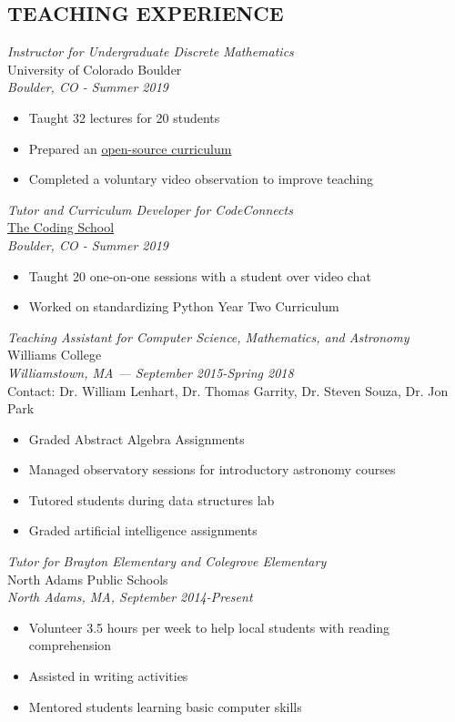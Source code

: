 \documentclass[line,margin]{res}
\begin{document}
\begin{resume}
  \section{TEACHING EXPERIENCE}
  {\sl Instructor for Undergraduate Discrete Mathematics} \\
  University of Colorado Boulder \\
  {\it Boulder, CO - Summer 2019} \\
  \begin{itemize}
      \item Taught 32 lectures for 20 students
      \item Prepared an \href{https://github.com/jmbhughes/CSCI2824-Discrete-Structures}{open-source curriculum}
      \item Completed a voluntary video observation to improve teaching
  \end{itemize}
  
  {\sl Tutor and Curriculum Developer for CodeConnects} \\
  \href{http://www.the-cs.org/}{The Coding School} \\
  {\it Boulder, CO - Summer 2019} \\
  \begin{itemize}
      \item Taught 20 one-on-one sessions with a student over video chat
      \item Worked on standardizing Python Year Two Curriculum
  \end{itemize}
  
  {\sl Teaching Assistant for Computer Science, Mathematics, and Astronomy} \\
  Williams College \\
  {\it Williamstown, MA — September 2015-Spring 2018} \\ 
  Contact: Dr. William Lenhart, Dr. Thomas Garrity, Dr. Steven Souza, Dr. Jon Park \\
  \begin{itemize}
  \item Graded Abstract Algebra Assignments
  \item Managed observatory sessions for introductory astronomy courses
  \item Tutored students during data structures lab
  \item Graded artificial intelligence assignments
  \end{itemize}

  {\sl Tutor for Brayton Elementary and Colegrove Elementary} \\
  North Adams Public Schools \\
  {\it North Adams, MA, September 2014-Present} \\
  \begin{itemize}
  \item Volunteer 3.5 hours per week to help local students with reading comprehension
  \item Assisted in writing activities
  \item Mentored students learning basic computer skills
  \end{itemize}


\end{resume}
\end{document}
